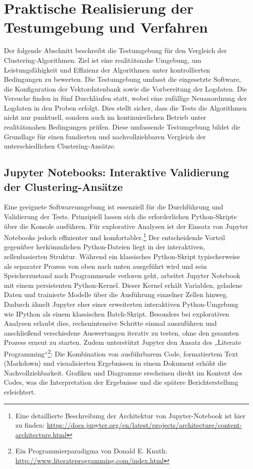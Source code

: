 \chapter{Praktische Realisierung der Testumgebung und Verfahren}
\label{chap:real}

Der folgende Abschnitt beschreibt die Testumgebung für den Vergleich der Clustering-Algorithmen. Ziel ist eine realitätsnahe Umgebung, um Leistungsfähigkeit und Effizienz der Algorithmen unter kontrollierten Bedingungen zu bewerten. Die Testumgebung umfasst die eingesetzte Software, die Konfiguration der Vektordatenbank sowie die Vorbereitung der Logdaten. Die Versuche finden in fünf Durchläufen statt, wobei eine zufällige Neuanordnung der Logdaten in den Proben erfolgt. Dies stellt sicher, dass die Tests die Algorithmen nicht nur punktuell, sondern auch im kontinuierlichen Betrieb unter realitätsnahen Bedingungen prüfen.
Diese umfassende Testumgebung bildet die Grundlage für einen fundierten und nachvollziehbaren Vergleich der unterschiedlichen Clustering-Ansätze.

\section{Jupyter Notebooks: Interaktive Validierung der Clustering-Ansätze}
Eine geeignete Softwareumgebung ist essenziell für die Durchführung und Validierung der Tests. Prinzipiell lassen sich die erforderlichen Python-Skripte über die Konsole ausführen. Für explorative Analysen ist der Einsatz von Jupyter Notebooks jedoch effizienter und komfortabler.\footnote{Eine detaillierte Beschreibung der Architektur von Jupyter-Notebook ist hier zu finden: \url{https://docs.jupyter.org/en/latest/projects/architecture/content-architecture.html}}
Der entscheidende Vorteil gegenüber herkömmlichen Python-Dateien liegt in der interaktiven, zellenbasierten Struktur. Während ein klassisches Python-Skript typischerweise als separater Prozess von oben nach unten ausgeführt wird und sein Speicherzustand nach Programmende verloren geht, arbeitet Jupyter Notebook mit einem persistenten Python-Kernel. Dieser Kernel erhält Variablen, geladene Daten und trainierte Modelle über die Ausführung einzelner Zellen hinweg. Dadurch ähnelt Jupyter eher einer erweiterten interaktiven Python-Umgebung wie IPython als einem klassischen Batch-Skript. Besonders bei explorativen Analysen erlaubt dies, rechenintensive Schritte einmal auszuführen und anschließend verschiedene Auswertungen iterativ zu testen, ohne den gesamten Prozess erneut zu starten.
Zudem unterstützt Jupyter den Ansatz des „Literate Programming“\footnote{Ein Programmierparadigma von Donald E. Knuth: \url{http://www.literateprogramming.com/index.html}}: Die Kombination von ausführbarem Code, formatiertem Text (Markdown) und visualisierten Ergebnissen in einem Dokument erhöht die Nachvollziehbarkeit. Grafiken und Diagramme erscheinen direkt im Kontext des Codes, was die Interpretation der Ergebnisse und die spätere Berichterstellung erleichtert.

